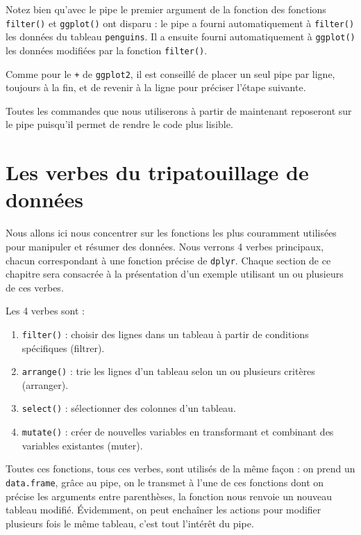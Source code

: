 \documentclass[
  a4paper,
  DIV=11,
  numbers=noendperiod,
  oneside]{scrreprt}
\providecommand{\tightlist}{%
  \setlength{\itemsep}{0pt}\setlength{\parskip}{0pt}}\usepackage{longtable,booktabs,array}
\begin{document}
Notez bien qu'avec le pipe le premier argument de la fonction des
fonctions \texttt{filter()} et \texttt{ggplot()} ont disparu : le pipe a
fourni automatiquement à \texttt{filter()} les données du tableau
\texttt{penguins}. Il a ensuite fourni automatiquement à
\texttt{ggplot()} les données modifiées par la fonction
\texttt{filter()}.

Comme pour le \texttt{+} de \texttt{ggplot2}, il est conseillé de placer
un seul pipe par ligne, toujours à la fin, et de revenir à la ligne pour
préciser l'étape suivante.

Toutes les commandes que nous utiliserons à partir de maintenant
reposeront sur le pipe puisqu'il permet de rendre le code plus lisible.

\section{Les verbes du tripatouillage de
données}\label{les-verbes-du-tripatouillage-de-donnuxe9es}

Nous allons ici nous concentrer sur les fonctions les plus couramment
utilisées pour manipuler et résumer des données. Nous verrons 4 verbes
principaux, chacun correspondant à une fonction précise de
\texttt{dplyr}. Chaque section de ce chapitre sera consacrée à la
présentation d'un exemple utilisant un ou plusieurs de ces verbes.

Les 4 verbes sont :

\begin{enumerate}
\def\labelenumi{\arabic{enumi}.}
\tightlist
\item
  \texttt{filter()} : choisir des lignes dans un tableau à partir de
  conditions spécifiques (filtrer).
\item
  \texttt{arrange()} : trie les lignes d'un tableau selon un ou
  plusieurs critères (arranger).
\item
  \texttt{select()} : sélectionner des colonnes d'un tableau.
\item
  \texttt{mutate()} : créer de nouvelles variables en transformant et
  combinant des variables existantes (muter).
\end{enumerate}

Toutes ces fonctions, tous ces verbes, sont utilisés de la même façon :
on prend un \texttt{data.frame}, grâce au pipe, on le transmet à l'une
de ces fonctions dont on précise les arguments entre parenthèses, la
fonction nous renvoie un nouveau tableau modifié. Évidemment, on peut
enchaîner les actions pour modifier plusieurs fois le même tableau,
c'est tout l'intérêt du pipe.
\end{document}
